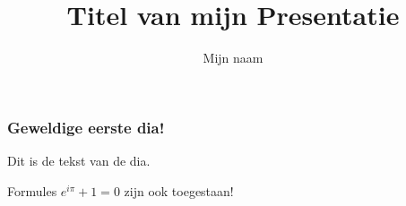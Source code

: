 \documentclass{beamer}
\title{Titel van mijn Presentatie}
\author{Mijn naam}
\begin{document}
\begin{frame}
  \titlepage
\end{frame}

\begin{frame}
  \frametitle{Geweldige eerste dia!}
  Dit is de tekst van de dia.

  Formules $e^{i\pi}+1=0$ zijn ook toegestaan!
\end{frame}
\end{document}

